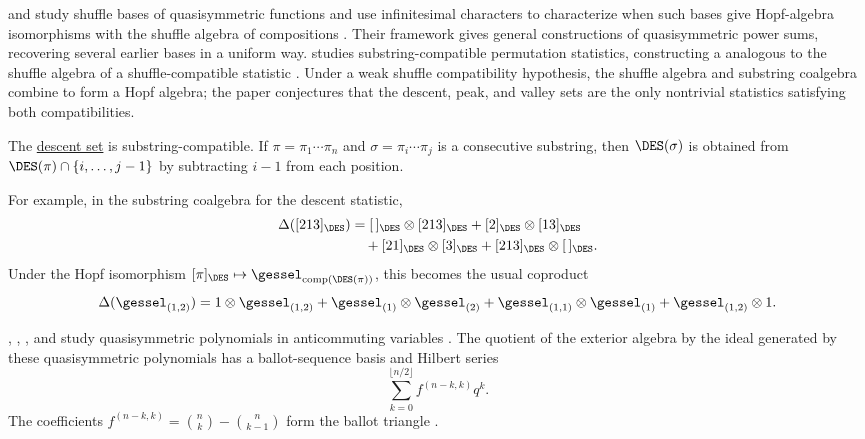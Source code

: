  and  study shuffle bases of
quasisymmetric functions and use infinitesimal characters to characterize
when such bases give Hopf-algebra isomorphisms with the shuffle algebra of
compositions \cite{LiuTang2023x}.  Their framework gives general
constructions of quasisymmetric power sums, recovering several earlier
bases in a uniform way.
 studies substring-compatible permutation statistics,
constructing a \label{substringCoalgebra}
analogous to the shuffle algebra of a
shuffle-compatible statistic \cite{Tang2025x}.  Under a weak shuffle
compatibility hypothesis, the shuffle algebra and substring coalgebra combine
to form a Hopf algebra; the paper conjectures that the descent, peak, and
valley sets are the only nontrivial statistics satisfying both compatibilities.

\begin{example*}
The \hyperref[descentSet]{descent set} is substring-compatible.
If $\pi=\pi_1\dotsm\pi_n$ and
$\sigma=\pi_i\dotsm\pi_j$ is a consecutive substring, then $\DES(\sigma)$ is
obtained from $\DES(\pi)\cap\{i,\dotsc,j-1\}$ by subtracting $i-1$ from each
position.

For example, in the substring coalgebra for the descent statistic,
\[
\begin{aligned}
\Delta([213]_{\DES})
&= [\,]_{\DES}\otimes [213]_{\DES}
 + [2]_{\DES}\otimes [13]_{\DES} \\
&\quad + [21]_{\DES}\otimes [3]_{\DES}
 + [213]_{\DES}\otimes [\,]_{\DES}.
\end{aligned}
\]
Under the Hopf isomorphism $[ \pi]_{\DES}\mapsto
\gessel_{\operatorname{comp}(\DES(\pi))}$, this becomes the usual coproduct
\[
\Delta(\gessel_{(1,2)})
= 1\otimes\gessel_{(1,2)}
  + \gessel_{(1)}\otimes\gessel_{(2)}
  + \gessel_{(1,1)}\otimes\gessel_{(1)}
  + \gessel_{(1,2)}\otimes 1.
\]
\end{example*}

, , , and
 study quasisymmetric polynomials in anticommuting
variables \cite{BergeronChanSoltaniZabrocki2023}.  The quotient of the
exterior algebra by the ideal generated by these quasisymmetric polynomials
has a ballot-sequence basis and Hilbert series
\[
  \sum_{k=0}^{\lfloor n/2\rfloor} f^{(n-k,k)} q^k.
\]
The coefficients $f^{(n-k,k)}=\binom{n}{k}-\binom{n}{k-1}$ form the ballot
triangle .

